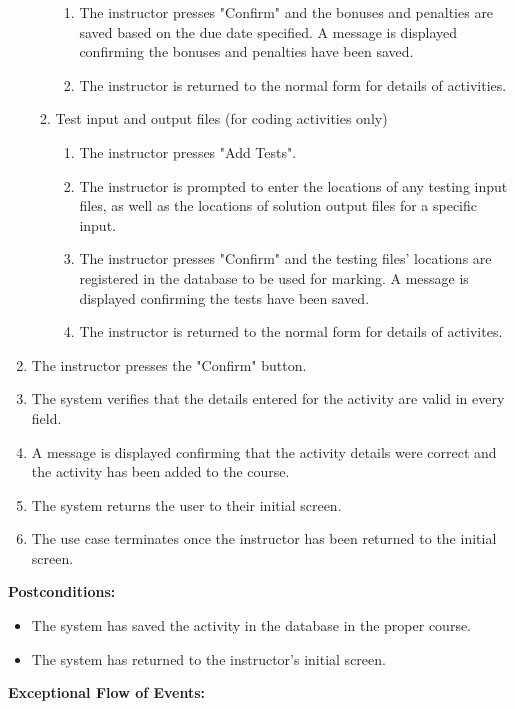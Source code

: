 \documentclass{article}
\begin{document}
\begin{enumerate}
\begin{enumerate}
\begin{enumerate}
				\item The instructor presses "Confirm" and the bonuses and penalties are
						saved based on the due date specified. A message is displayed
						confirming the bonuses and penalties have been saved.
				\item The instructor is returned to the normal form for details of activities.
			\end{enumerate}
		\item Test input and output files (for coding activities only)
			\begin{enumerate}
				\item The instructor presses "Add Tests".
				\item The instructor is prompted to enter the locations of any testing input
						files, as well as the locations of solution output files for a specific
						input. 
				\item The instructor presses "Confirm" and the testing files' locations are
						registered in the database to be used for marking. A message is
						displayed confirming the tests have been saved.
				\item The instructor is returned to the normal form for details of activites.
			\end{enumerate}
	\end{enumerate}
	\item The instructor presses the "Confirm" button.
	\item The system verifies that the details entered for the activity are valid in every field.
	\item A message is displayed confirming that the activity details were correct and the
			activity has been added to the course.
	\item The system returns the user to their initial screen.
	\item The use case terminates once the instructor has been returned to the initial
			screen.
\end{enumerate}
\textbf{Postconditions:}
\begin{itemize}
	\item The system has saved the activity in the database in the proper course.
	\item The system has returned to the instructor's initial screen.
\end{itemize}
\textbf{Exceptional Flow of Events:}
\end{document}
